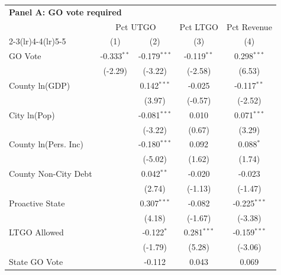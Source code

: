 \begingroup
\centering
\begin{tabular*}{\textwidth}{@{\extracolsep{\fill}}lcccc}
\multicolumn{5}{l}{\textbf{Panel A: GO vote required}}\\

\addlinespace
   \toprule
    & \multicolumn{2}{c}{Pct UTGO} & Pct LTGO & Pct Revenue\\
   \cmidrule(lr){2-3}\cmidrule(lr){4-4}\cmidrule(lr){5-5}
                               & (1)           & (2)            & (3)           & (4)\\  
   \midrule 
   GO Vote                     & -0.333$^{**}$ & -0.179$^{***}$ & -0.119$^{**}$ & 0.298$^{***}$\\   
                               & (-2.29)      & (-3.22)       & (-2.58)      & (6.53)\\   
   County ln(GDP)              &               & 0.142$^{***}$  & -0.025        & -0.117$^{**}$\\   
                               &               & (3.97)        & (-0.57)      & (-2.52)\\   
   City ln(Pop)                &               & -0.081$^{***}$ & 0.010         & 0.071$^{***}$\\   
                               &               & (-3.22)       & (0.67)       & (3.29)\\   
   County ln(Pers. Inc)        &               & -0.180$^{***}$ & 0.092         & 0.088$^{*}$\\   
                               &               & (-5.02)       & (1.62)       & (1.74)\\   
   County Non-City Debt        &               & 0.042$^{**}$   & -0.020        & -0.023\\   
                               &               & (2.74)        & (-1.13)      & (-1.47)\\   
   Proactive State             &               & 0.307$^{***}$  & -0.082        & -0.225$^{***}$\\   
                               &               & (4.18)        & (-1.67)      & (-3.38)\\   
   LTGO Allowed                &               & -0.122$^{*}$   & 0.281$^{***}$ & -0.159$^{***}$\\   
                               &               & (-1.79)       & (5.28)       & (-3.06)\\   
   State GO Vote               &               & -0.112         & 0.043         & 0.069\\   

\end{tabular*}
